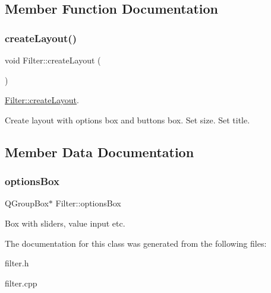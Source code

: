 \subsection{Member Function Documentation}
\mbox{\label{class_filter_a693e18ecd85c957363367e636f8ba2e7}} 
\subsubsection{\texorpdfstring{createLayout()}{createLayout()}}
{\footnotesize\ttfamily void Filter\+::create\+Layout (\begin{DoxyParamCaption}{ }\end{DoxyParamCaption})\hspace{0.3cm}{\ttfamily [protected]}}



\mbox{\hyperlink{class_filter_a693e18ecd85c957363367e636f8ba2e7}{Filter\+::create\+Layout}}. 

Create layout with options box and buttons box. Set size. Set title. 

\subsection{Member Data Documentation}
\mbox{\label{class_filter_a348bf61449dd88f17d9cb36b2b7881e0}} 
\subsubsection{\texorpdfstring{optionsBox}{optionsBox}}
{\footnotesize\ttfamily Q\+Group\+Box$\ast$ Filter\+::options\+Box\hspace{0.3cm}{\ttfamily [protected]}}

Box with sliders, value input etc. 

The documentation for this class was generated from the following files\+:\begin{DoxyCompactItemize}
\item 
filter.\+h\item 
filter.\+cpp\end{DoxyCompactItemize}
